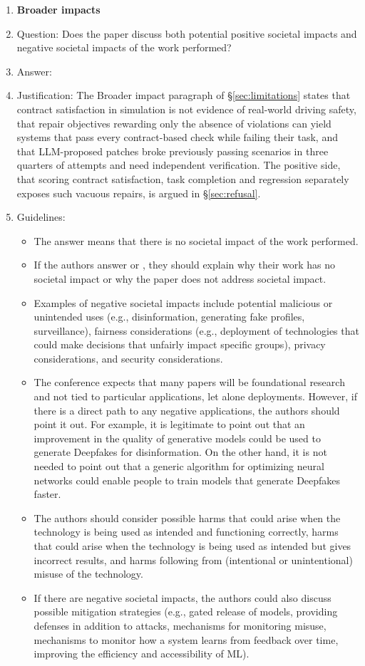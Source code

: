 \begin{enumerate}
\item {\bf Broader impacts}
    \item[] Question: Does the paper discuss both potential positive societal impacts and negative societal impacts of the work performed?
    \item[] Answer: \answerYes{}
    \item[] Justification: The Broader impact paragraph of \S\ref{sec:limitations} states that contract satisfaction in simulation is not evidence of real-world driving safety, that repair objectives rewarding only the absence of violations can yield systems that pass every contract-based check while failing their task, and that LLM-proposed patches broke previously passing scenarios in three quarters of attempts and need independent verification. The positive side, that scoring contract satisfaction, task completion and regression separately exposes such vacuous repairs, is argued in \S\ref{sec:refusal}.
    \item[] Guidelines:
    \begin{itemize}
        \item The answer \answerNA{} means that there is no societal impact of the work performed.
        \item If the authors answer \answerNA{} or \answerNo{}, they should explain why their work has no societal impact or why the paper does not address societal impact.
        \item Examples of negative societal impacts include potential malicious or unintended uses (e.g., disinformation, generating fake profiles, surveillance), fairness considerations (e.g., deployment of technologies that could make decisions that unfairly impact specific groups), privacy considerations, and security considerations.
        \item The conference expects that many papers will be foundational research and not tied to particular applications, let alone deployments. However, if there is a direct path to any negative applications, the authors should point it out. For example, it is legitimate to point out that an improvement in the quality of generative models could be used to generate Deepfakes for disinformation. On the other hand, it is not needed to point out that a generic algorithm for optimizing neural networks could enable people to train models that generate Deepfakes faster.
        \item The authors should consider possible harms that could arise when the technology is being used as intended and functioning correctly, harms that could arise when the technology is being used as intended but gives incorrect results, and harms following from (intentional or unintentional) misuse of the technology.
        \item If there are negative societal impacts, the authors could also discuss possible mitigation strategies (e.g., gated release of models, providing defenses in addition to attacks, mechanisms for monitoring misuse, mechanisms to monitor how a system learns from feedback over time, improving the efficiency and accessibility of ML).
    \end{itemize}


\end{enumerate}
